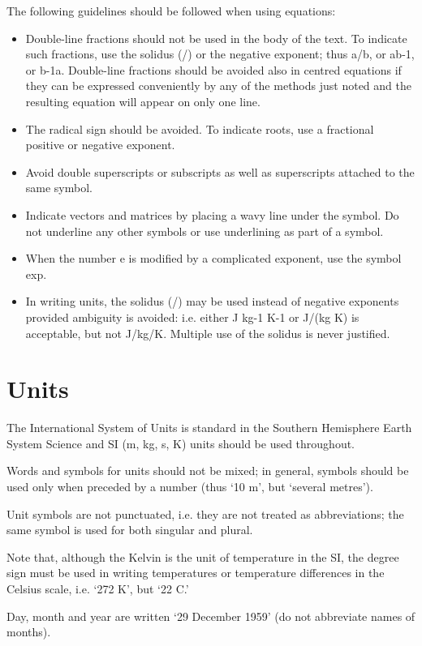 \documentclass[10pt]{article}
\begin{document}
The following guidelines should be followed when using equations:
\begin{itemize}
  \item Double-line fractions should not be used in the body of the text. To indicate such fractions, use the solidus (/) or the negative exponent; thus a/b, or ab-1, or b-1a. Double-line fractions should be avoided also in centred equations if they can be expressed conveniently by any of the methods just noted and the resulting equation will appear on only one line.
  \item The radical sign should be avoided. To indicate roots, use a fractional positive or negative exponent.
  \item Avoid double superscripts or subscripts as well as superscripts attached to the same symbol.
  \item Indicate vectors and matrices by placing a wavy line under the symbol. Do not underline any other symbols or use underlining as part of a symbol.
  \item When the number e is modified by a complicated exponent, use the symbol exp.
  \item In writing units, the solidus (/) may be used instead of negative exponents provided ambiguity is avoided: i.e. either J kg-1 K-1 or J/(kg K) is acceptable, but not J/kg/K. Multiple use of the solidus is never justified.
\end{itemize}

\section{Units}
\label{Unites}
The International System of Units is standard in the Southern Hemisphere Earth System Science and SI (m, kg, s, K) units should be used throughout.

Words and symbols for units should not be mixed; in general, symbols should be used only when preceded by a number (thus `10 m', but `several metres').

Unit symbols are not punctuated, i.e. they are not treated as abbreviations; the same symbol is used for both singular and plural.

Note that, although the Kelvin is the unit of temperature in the SI, the degree sign must be used in writing temperatures or temperature differences in the Celsius scale, i.e. `272 K', but `22 \textdegree C.'

Day, month and year are written `29 December 1959' (do not abbreviate names of months).
\end{document}
